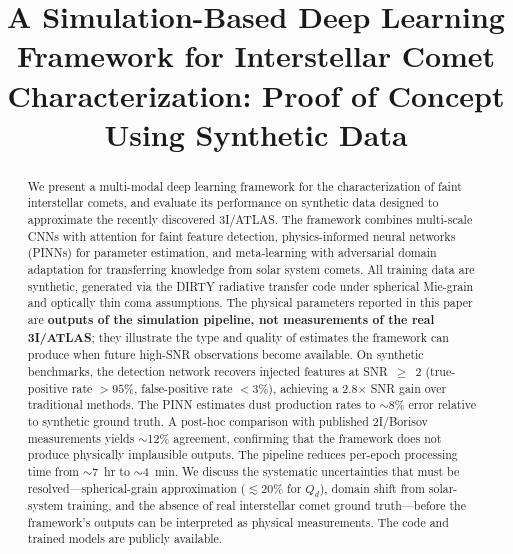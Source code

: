 \documentclass[preprint2]{aastex631}
\begin{document}
\title{A Simulation-Based Deep Learning Framework for Interstellar Comet Characterization: Proof of Concept Using Synthetic Data}

%
%

\accepted{}
\published{}

\begin{abstract}
We present a multi-modal deep learning framework for the characterization of faint interstellar comets, and evaluate its performance on synthetic data designed to approximate the recently discovered 3I/ATLAS. The framework combines multi-scale CNNs with attention for faint feature detection, physics-informed neural networks (PINNs) for parameter estimation, and meta-learning with adversarial domain adaptation for transferring knowledge from solar system comets. All training data are synthetic, generated via the DIRTY radiative transfer code under spherical Mie-grain and optically thin coma assumptions. The physical parameters reported in this paper are \textbf{outputs of the simulation pipeline, not measurements of the real 3I/ATLAS}; they illustrate the type and quality of estimates the framework can produce when future high-SNR observations become available. On synthetic benchmarks, the detection network recovers injected features at SNR~$\geq$~2 (true-positive rate $>95\%$, false-positive rate $<3\%$), achieving a 2.8$\times$ SNR gain over traditional methods. The PINN estimates dust production rates to $\sim$8\% error relative to synthetic ground truth. A post-hoc comparison with published 2I/Borisov measurements yields $\sim$12\% agreement, confirming that the framework does not produce physically implausible outputs. The pipeline reduces per-epoch processing time from $\sim$7~hr to $\sim$4~min. We discuss the systematic uncertainties that must be resolved---spherical-grain approximation ($\lesssim 20\%$ for $Q_d$), domain shift from solar-system training, and the absence of real interstellar comet ground truth---before the framework's outputs can be interpreted as physical measurements. The code and trained models are publicly available.
\end{abstract}
\end{document}
